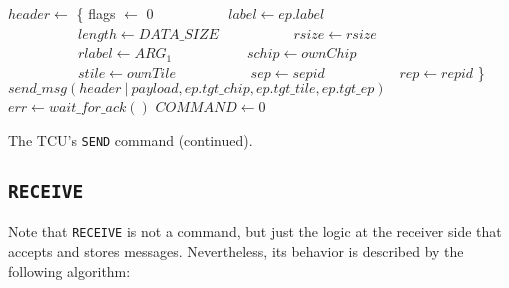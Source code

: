 \begin{algorithm}
    \setcounter{AlgoLine}{37}
    $header \gets$ \{ flags $\gets$ 0\;
    $\quad\quad\quad\quad\quad label \gets ep.label$\;
    $\quad\quad\quad\quad\quad length \gets DATA\_SIZE$\;
    $\quad\quad\quad\quad\quad rsize \gets rsize$\;
    $\quad\quad\quad\quad\quad rlabel \gets ARG_1$\;
    $\quad\quad\quad\quad\quad schip \gets ownChip$\;
    $\quad\quad\quad\quad\quad stile \gets ownTile$\;
    $\quad\quad\quad\quad\quad sep \gets sepid$\;
    $\quad\quad\quad\quad\quad rep \gets repid$ \}\;
    $send\_msg(header\ |\ payload, ep.tgt\_chip, ep.tgt\_tile, ep.tgt\_ep)$\;
    $err \gets wait\_for\_ack()$\;
    \BlankLine
    \BlankLine
    $COMMAND \gets 0$\;
    \caption{The TCU's \texttt{SEND} command (continued).}
\end{algorithm}

\newpage
\subsection{\texttt{RECEIVE}}

Note that \texttt{RECEIVE} is not a command, but just the logic at the receiver side that accepts
and stores messages. Nevertheless, its behavior is described by the following algorithm:


